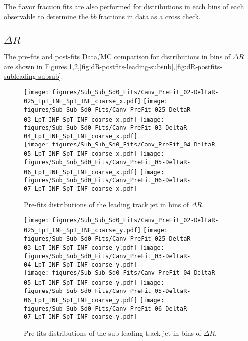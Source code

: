
The flavor fraction fits are also performed for \subsubsdzero distributions in each bins of each observable to determine the $b\bar b $ fractions in data as a cross check. 

\subsection{$\Delta R$}

The pre-fits and post-fits Data/MC comparison for \subsubsdzero distributions in bins of $\Delta R$ are shown in Figures.\ref{fig:dR-prefits-leading-subsub},\ref{fig:dR-prefits-subleading-subsub},\ref{fig:dR-postfits-leading-subsub},\ref{fig:dR-postfits-subleading-subsub}.


\begin{figure}[htbp]
  \centering
 \texttt{[image: figures/Sub\_Sub\_Sd0\_Fits/Canv\_PreFit\_02-DeltaR-025\_LpT\_INF\_SpT\_INF\_coarse\_x.pdf]}
 \texttt{[image: figures/Sub\_Sub\_Sd0\_Fits/Canv\_PreFit\_025-DeltaR-03\_LpT\_INF\_SpT\_INF\_coarse\_x.pdf]}
 \texttt{[image: figures/Sub\_Sub\_Sd0\_Fits/Canv\_PreFit\_03-DeltaR-04\_LpT\_INF\_SpT\_INF\_coarse\_x.pdf]}\\
 \texttt{[image: figures/Sub\_Sub\_Sd0\_Fits/Canv\_PreFit\_04-DeltaR-05\_LpT\_INF\_SpT\_INF\_coarse\_x.pdf]}
 \texttt{[image: figures/Sub\_Sub\_Sd0\_Fits/Canv\_PreFit\_05-DeltaR-06\_LpT\_INF\_SpT\_INF\_coarse\_x.pdf]}
 \texttt{[image: figures/Sub\_Sub\_Sd0\_Fits/Canv\_PreFit\_06-DeltaR-07\_LpT\_INF\_SpT\_INF\_coarse\_x.pdf]}\\

\caption{Pre-fits \subsubsdzero distributions of the leading track jet in bins of $\Delta R$. }
  \label{fig:dR-prefits-leading-subsub}
\end{figure}


\begin{figure}[htbp]
  \centering
 \texttt{[image: figures/Sub\_Sub\_Sd0\_Fits/Canv\_PreFit\_02-DeltaR-025\_LpT\_INF\_SpT\_INF\_coarse\_y.pdf]}
 \texttt{[image: figures/Sub\_Sub\_Sd0\_Fits/Canv\_PreFit\_025-DeltaR-03\_LpT\_INF\_SpT\_INF\_coarse\_y.pdf]}
 \texttt{[image: figures/Sub\_Sub\_Sd0\_Fits/Canv\_PreFit\_03-DeltaR-04\_LpT\_INF\_SpT\_INF\_coarse\_y.pdf]}\\
 \texttt{[image: figures/Sub\_Sub\_Sd0\_Fits/Canv\_PreFit\_04-DeltaR-05\_LpT\_INF\_SpT\_INF\_coarse\_y.pdf]}
 \texttt{[image: figures/Sub\_Sub\_Sd0\_Fits/Canv\_PreFit\_05-DeltaR-06\_LpT\_INF\_SpT\_INF\_coarse\_y.pdf]}
 \texttt{[image: figures/Sub\_Sub\_Sd0\_Fits/Canv\_PreFit\_06-DeltaR-07\_LpT\_INF\_SpT\_INF\_coarse\_y.pdf]}\\

\caption{Pre-fits \subsubsdzero distributions of the sub-leading track jet in bins of $\Delta R$. }
  \label{fig:dR-prefits-subleading-subsub}
\end{figure}

